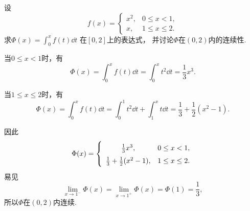 \begin{example}
设\begin{equation*}
	f(x) = \left\{ \begin{array}{cl}
		x^2, & 0 \leq x < 1, \\
		x, & 1 \leq x \leq 2.
	\end{array} \right.
\end{equation*}
求\(\Phi(x) = \int_0^x f(t) \dd{t}\)
在\([0,2]\)上的表达式，
并讨论\(\Phi\)在\((0,2)\)内的连续性.
\begin{solution}
当\(0 \leq x < 1\)时，有\begin{equation*}
	\Phi(x) = \int_0^x f(t) \dd{t}
	= \int_0^x t^2 \dd{t}
	= \frac13 x^3.
\end{equation*}

当\(1 \leq x \leq 2\)时，有\begin{equation*}
	\Phi(x) = \int_0^x f(t) \dd{t}
	= \int_0^1 t^2 \dd{t}
	+ \int_1^x t \dd{t}
	= \frac13 + \frac12 (x^2-1).
\end{equation*}

因此\begin{equation*}
	\Phi(x) = \left\{ \def\arraystretch{1.5} \begin{array}{cl}
		\frac13 x^3, & 0 \leq x < 1, \\
		\frac13 + \frac12 (x^2-1), & 1 \leq x \leq 2.
	\end{array} \right.
\end{equation*}
易见\begin{equation*}
	\lim_{x\to1^-} \Phi(x)
	= \lim_{x\to1^+} \Phi(x)
	= \Phi(1)
	= \frac13,
\end{equation*}
所以\(\Phi\)在\((0,2)\)内连续.
\end{solution}
\end{example}

